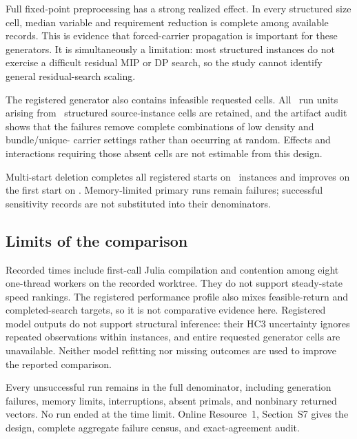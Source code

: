 Full fixed-point preprocessing has a strong realized effect. In every
structured size cell, median variable and requirement reduction is complete
among available records. This is evidence that forced-carrier propagation is
important for these generators. It is simultaneously a limitation: most
structured instances do not exercise a difficult residual MIP or DP search, so
the study cannot identify general residual-search scaling.

\AORPreprocessingMultistartTable

The registered generator also contains infeasible requested cells. All
\AORGenerationFailed\ run units arising from
\AORGenerationFailedInstances\ structured source-instance cells are retained,
and the artifact audit shows that
the failures remove complete combinations of low density and bundle/unique-
carrier settings rather than occurring at random. Effects and interactions
requiring those absent cells are not estimable from this design.

Multi-start deletion completes all registered starts on
\AORMultistartComplete\ instances and improves on the first start on
\AORMultistartImproved. Memory-limited primary runs remain failures; successful
sensitivity records are not substituted into their denominators.

\subsection{Limits of the comparison}

Recorded times include first-call Julia compilation and contention among eight
one-thread workers on the recorded worktree. They do not support steady-state
speed rankings. The registered performance profile also mixes feasible-return
and completed-search targets, so it is not comparative evidence here.
Registered model outputs do not support structural inference: their HC3
uncertainty ignores repeated observations within instances, and entire
requested generator cells are unavailable. Neither model refitting nor missing
outcomes are used to improve the reported comparison.

Every unsuccessful run remains in the full denominator, including generation
failures, memory limits, interruptions, absent primals, and nonbinary returned
vectors. No run ended at the time limit. Online Resource~1, Section~S7 gives
the design, complete aggregate failure census, and exact-agreement audit.
